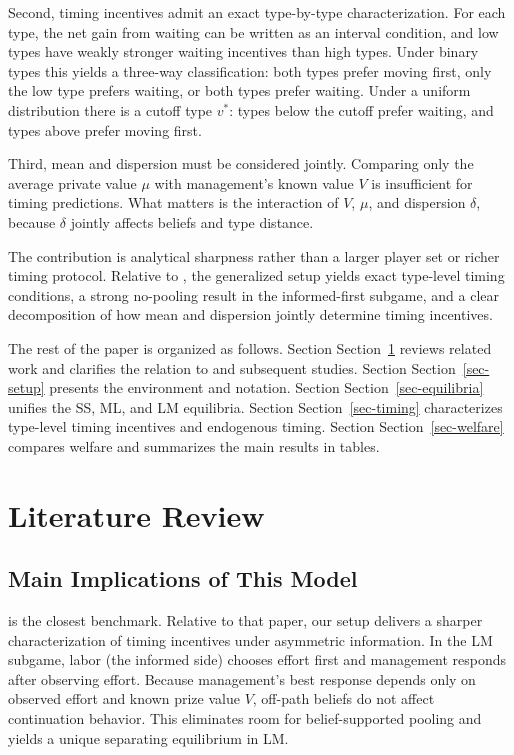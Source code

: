 \documentclass[
  english,
  a4paper,
  12pt]{article}
\theoremstyle{plain}
\theoremstyle{plain}
\theoremstyle{definition}
\theoremstyle{remark}
\begin{document}
Second, timing incentives admit an exact type-by-type characterization.
For each type, the net gain from waiting can be written as an interval
condition, and low types have weakly stronger waiting incentives than
high types. Under binary types this yields a three-way classification:
both types prefer moving first, only the low type prefers waiting, or
both types prefer waiting. Under a uniform distribution there is a
cutoff type \(v^*\): types below the cutoff prefer waiting, and types
above prefer moving first.

Third, mean and dispersion must be considered jointly. Comparing only
the average private value \(\mu\) with management's known value \(V\) is
insufficient for timing predictions. What matters is the interaction of
\(V\), \(\mu\), and dispersion \(\delta\), because \(\delta\) jointly
affects beliefs and type distance.

The contribution is analytical sharpness rather than a larger player set
or richer timing protocol. Relative to \citet{fu2006}, the generalized
setup yields exact type-level timing conditions, a strong no-pooling
result in the informed-first subgame, and a clear decomposition of how
mean and dispersion jointly determine timing incentives.

The rest of the paper is organized as follows. Section
Section~\ref{sec-literature} reviews related work and clarifies the
relation to \citet{fu2006} and subsequent studies. Section
Section~\ref{sec-setup} presents the environment and notation. Section
Section~\ref{sec-equilibria} unifies the SS, ML, and LM equilibria.
Section Section~\ref{sec-timing} characterizes type-level timing
incentives and endogenous timing. Section Section~\ref{sec-welfare}
compares welfare and summarizes the main results in tables.

\section{Literature Review}\label{sec-literature}

\subsection{Main Implications of This
Model}\label{main-implications-of-this-model}

\citet{fu2006} is the closest benchmark. Relative to that paper, our
setup delivers a sharper characterization of timing incentives under
asymmetric information. In the LM subgame, labor (the informed side)
chooses effort first and management responds after observing effort.
Because management's best response depends only on observed effort and
known prize value \(V\), off-path beliefs do not affect continuation
behavior. This eliminates room for belief-supported pooling and yields a
unique separating equilibrium in LM.
\end{document}
